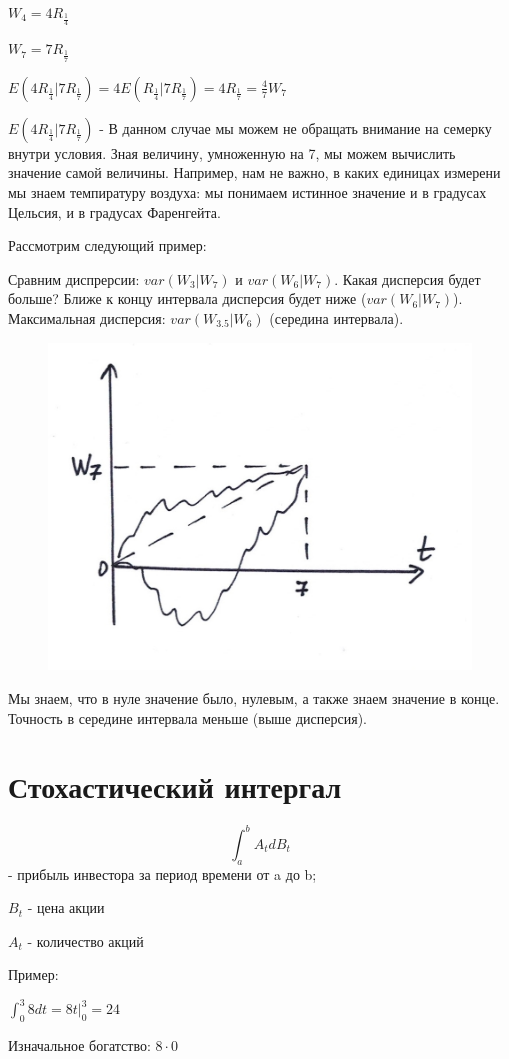 \documentclass[a4paper]{article}
\begin{document}
$W_4=4R_\frac{1}{4}$

$W_7=7R_\frac{1}{7}$

$E(4R_\frac{1}{4}|7R_\frac{1}{7})=4E(R_\frac{1}{4}|7R_\frac{1}{7})=4R_\frac{1}{7}=\frac{4}{7}W_7$

$E(4R_\frac{1}{4}|7R_\frac{1}{7})$ - В данном случае мы можем не обращать внимание на семерку внутри условия. Зная величину, умноженную на 7, мы можем вычислить значение самой величины. Например, нам не важно, в каких единицах измерени мы знаем темпиратуру воздуха: мы понимаем истинное значение и в градусах Цельсия, и в градусах Фаренгейта.

\parindent=2cm

Рассмотрим следующий пример:

\parindent=2cm

Сравним диспрерсии: $var(W_3|W_7)$ и $var(W_6|W_7)$.
Какая дисперсия будет больше?
Ближе к концу интервала дисперсия будет ниже ($var(W_6|W_7)$).
Максимальная дисперсия: $var(W_{3.5}|W_6)$ (середина интервала).

\begin{figure}[h!]
\includegraphics[width=0.5\linewidth]{04_lecture1}
\end{figure}

Мы знаем, что в нуле значение было, нулевым, а также знаем значение в конце. Точность в середине интервала меньше (выше дисперсия).

\section*{Стохастический интергал}

$$\int_{a}^{b} A_t dB_t$$ - прибыль инвестора за период времени от a до b;

$B_t$ - цена акции

$A_t$ - количество акций

Пример:

$\int_{0}^{3} 8 dt=8 t | _0^3=24$

Изначальное богатство: $8\cdot0$
\end{document}
